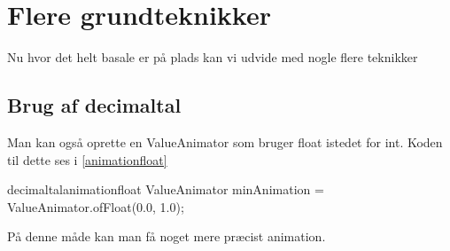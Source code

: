 \section{Flere grundteknikker}
Nu hvor det helt basale er på plads kan vi udvide med nogle flere teknikker
\subsection{Brug af decimaltal}
Man kan også oprette en ValueAnimator som bruger float istedet for int. Koden til dette ses i \autoref{animationfloat}
\begin{JavaCode}{decimaltal}{animationfloat}
	ValueAnimator minAnimation = ValueAnimator.ofFloat(0.0, 1.0);
\end{JavaCode}
På denne måde kan man få noget mere præcist animation.

